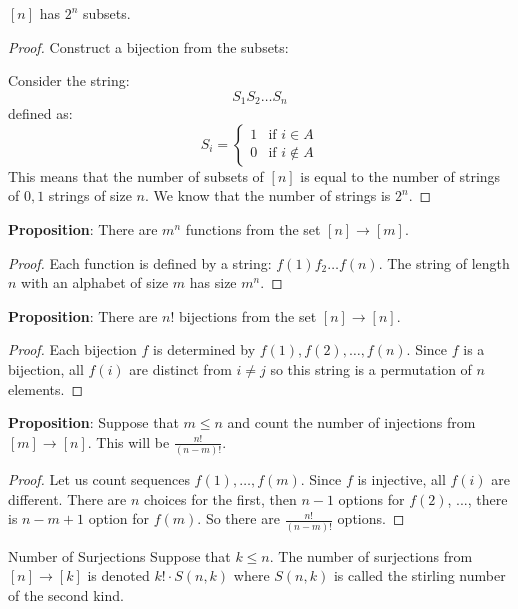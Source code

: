 \documentclass{report}
\begin{document}
\begin{examples}
    \begin{example}
        $[n]$ has $2^{n}$ subsets.
            \begin{proof}
                Construct a bijection from the subsets:
                    \begin{center}
                    \end{center}
                Consider the string:
                    \begin{equation*}
                        S_{1}S_{2}\ldots S_{n}
                    \end{equation*}
                defined as:
                    \begin{equation*}
                        S_{i} = \begin{cases}
                            1 & \text{if $i \in A$} \\
                            0 & \text{if $i \notin A$}
                        \end{cases}
                    \end{equation*}
                This means that the number of subsets of $[n]$ is equal to the number of strings of $0, 1$ strings of size $n$. We know that the number of strings is $2^{n}$. 
            \end{proof}
    \end{example}
\end{examples}
\textbf{Proposition}: There are $m^{n}$ functions from the set $[n] \rightarrow [m]$.
    \begin{proof}
        Each function is defined by a string: $f(1)f_{2}\ldots f(n)$. The string of length $n$ with an alphabet of size $m$ has size $m^{n}$.
    \end{proof}
\textbf{Proposition}: There are $n!$ bijections from the set $[n] \rightarrow [n]$.
    \begin{proof}
        Each bijection $f$ is determined by $f(1), f(2), \ldots, f(n)$. Since $f$ is a bijection, all $f(i)$ are distinct from $i \neq j$ so this string is a permutation of $n$ elements. 
    \end{proof}
\textbf{Proposition}: Suppose that $m \leq n$ and count the number of injections from $[m] \rightarrow [n]$. This will be $\frac{n!}{(n - m)!}$.
    \begin{proof}
        Let us count sequences $f(1), \ldots, f(m)$. Since $f$ is injective, all $f(i)$ are different. There are $n$ choices for the first, then $n - 1$ options for $f(2)$, ..., there is $n - m + 1$ option for $f(m)$. So there are $\frac{n!}{(n - m)!}$ options. 
    \end{proof}
\begin{definition}{Number of Surjections}
    Suppose that $k \leq n$. The number of surjections from $[n] \rightarrow [k]$ is denoted $k! \cdot S(n, k)$ where $S(n, k)$ is called the stirling number of the second kind.
\end{definition}
\end{document}
